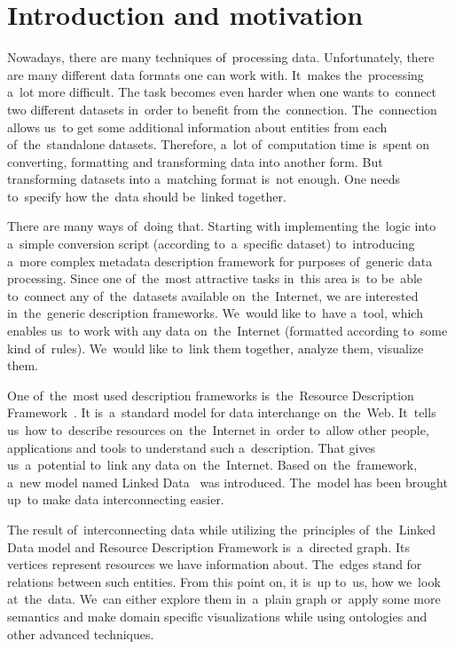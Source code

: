 \chapter*{Introduction and motivation}
\label{ch:preface}
Nowadays, there are many techniques of~processing data. Unfortunately, there are many
different data formats one can work with. It~makes the~processing a~lot more difficult.
The task becomes even harder when one wants to~connect two different datasets in~order to
benefit from the~connection. The~connection allows us~to get some additional information
about entities from each of~the~standalone datasets. Therefore, a~lot of~computation time is~spent
on converting, formatting and transforming data into another form. But transforming datasets
into a~matching format is~not enough. One needs to~specify how the~data should be~linked
together.

There are many ways of~doing that. Starting with implementing the~logic into a~simple conversion
script (according to~a~specific dataset) to~introducing a~more complex metadata description
framework for purposes of~generic data processing. Since one of~the~most attractive
tasks in~this area is~to be~able to~connect any of~the~datasets available on~the~Internet,
we are interested in~the~generic description frameworks. We~would like to~have 
a~tool, 
which enables us~to work with any data on~the~Internet (formatted according to~some
kind of~rules). We~would like to~link them together, analyze them, visualize 
them.

One of~the~most used description frameworks is~the~Resource Description Framework~\cite{rdf}.
It is~a~standard model for data interchange on~the~Web. It~tells us~how to~describe
resources on~the~Internet in~order to~allow other people, applications and tools
to understand such a~description. That gives us~a~potential to~link any data on~the~Internet.
Based on~the~framework, a~new model named Linked Data~\cite{ld} was introduced. The~model
has been brought up~to make data interconnecting easier.

The result of~interconnecting data while utilizing the~principles of~the~Linked Data model
and Resource Description Framework is~a~directed graph. Its vertices represent resources we
have information about. The~edges stand for relations between such entities. From this point on,
it is~up to~us, how we~look at~the~data. We~can either explore them in~a~plain graph or~apply
some more semantics and make domain specific visualizations while using ontologies
and other advanced techniques.

